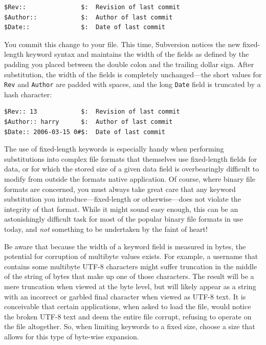 \begin{verbatim}
$Rev::               $:  Revision of last commit
$Author::            $:  Author of last commit
$Date::              $:  Date of last commit
\end{verbatim}

You commit this change to your file. This time, Subversion notices the
new fixed-length keyword syntax and maintains the width of the fields as
defined by the padding you placed between the double colon and the
trailing dollar sign. After substitution, the width of the fields is
completely unchanged---the short values for \texttt{Rev} and
\texttt{Author} are padded with spaces, and the long \texttt{Date} field
is truncated by a hash character:

\begin{verbatim}
$Rev:: 13            $:  Revision of last commit
$Author:: harry      $:  Author of last commit
$Date:: 2006-03-15 0#$:  Date of last commit
\end{verbatim}

The use of fixed-length keywords is especially handy when performing
substitutions into complex file formats that themselves use fixed-length
fields for data, or for which the stored size of a given data field is
overbearingly difficult to modify from outside the
format\textquotesingle s native application. Of course, where binary
file formats are concerned, you must always take great care that any
keyword substitution you introduce---fixed-length or otherwise---does
not violate the integrity of that format. While it might sound easy
enough, this can be an astonishingly difficult task for most of the
popular binary file formats in use today, and \emph{not} something to be
undertaken by the faint of heart!

Be aware that because the width of a keyword field is measured in bytes,
the potential for corruption of multibyte values exists. For example, a
username that contains some multibyte UTF-8 characters might suffer
truncation in the middle of the string of bytes that make up one of
those characters. The result will be a mere truncation when viewed at
the byte level, but will likely appear as a string with an incorrect or
garbled final character when viewed as UTF-8 text. It is conceivable
that certain applications, when asked to load the file, would notice the
broken UTF-8 text and deem the entire file corrupt, refusing to operate
on the file altogether. So, when limiting keywords to a fixed size,
choose a size that allows for this type of byte-wise expansion.

